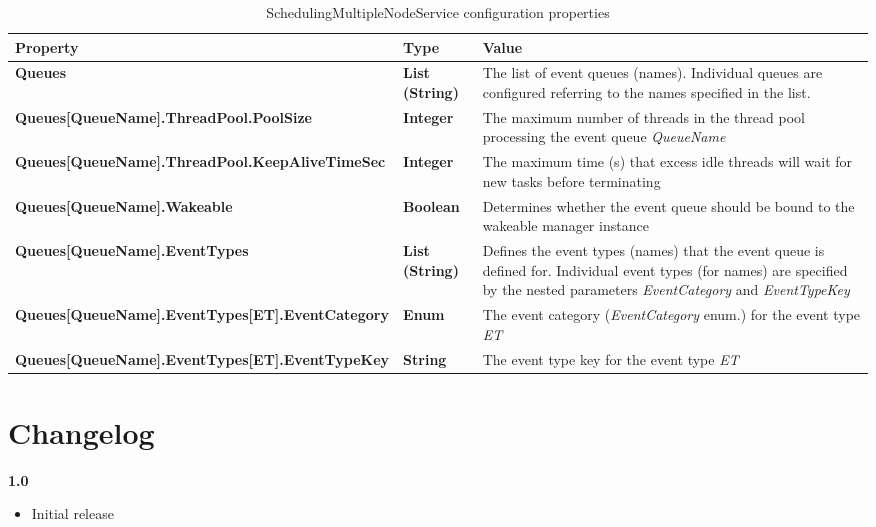 \begin{table}
\scriptsize
\begin{center}
\begin{tabular}{p{6.3cm} p{0.9cm} p{7.3cm}}
	\hline
	\textbf{Property}											& \textbf{Type}						& \textbf{Value}					\\[1mm]
    \hline
	\textbf{Queues}												& \textbf{List (String)}			& The list of event queues (names). Individual queues are configured referring to the names specified in the list.		\\[1.5mm]	
	\textbf{Queues[QueueName].ThreadPool.PoolSize}				& \textbf{Integer}					& The maximum number of threads in the thread pool processing the event queue \emph{QueueName}		\\[1.5mm]	
	\textbf{Queues[QueueName].ThreadPool.KeepAliveTimeSec}		& \textbf{Integer}					& The maximum time (s) that excess idle threads will wait for new tasks before terminating			\\[1.5mm]	
	\textbf{Queues[QueueName].Wakeable}							& \textbf{Boolean}					& Determines whether the event queue should be bound to the wakeable manager instance					\\[1.5mm]	
	\textbf{Queues[QueueName].EventTypes}						& \textbf{List (String)}			& Defines the event types (names) that the event queue is defined for. Individual event types (for names) are specified by the nested parameters \emph{EventCategory} and \emph{EventTypeKey}			\\[1.5mm]	
	\textbf{Queues[QueueName].EventTypes[ET].EventCategory}		& \textbf{Enum}					& The event category (\emph{EventCategory} enum.) for the event type \emph{ET}						\\[1.5mm]	
	\textbf{Queues[QueueName].EventTypes[ET].EventTypeKey}		& \textbf{String}					& The event type key for the event type \emph{ET}						\\[1.5mm]	
    \hline
\end{tabular}
\end{center}
\caption{SchedulingMultipleNodeService configuration properties}
\label{tab:libSchedulingMultipleNodeService}
\end{table}





\chapter{Changelog}

\noindent
\textbf{1.0}
\begin{itemize}
	\renewcommand{\labelitemi}{$\bullet$}
	\item Initial release
\end{itemize}
\newline

